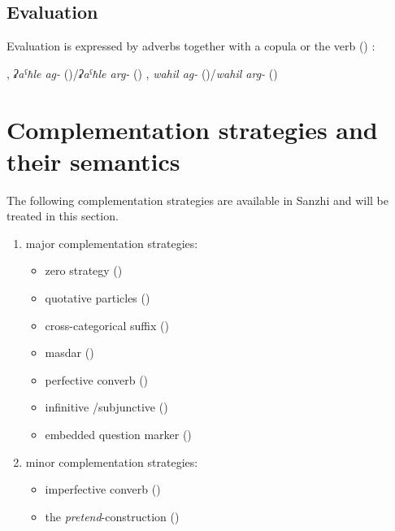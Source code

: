 
\subsection{Evaluation}
\label{ssec:Evaluation}

Evaluation is expressed by adverbs together with a copula or the verb  () :
%
\begin{exe}
	\ex	\label{ex:evaluation verbs}
	\begin{xlist}
		\ex	{}, \textit{ʡaˁħle ag-} ()\slash\textit{ʡaˁħle arg-} () 
		\ex	{}, \textit{wahil ag-} ()\slash\textit{wahil arg-} () 
	\end{xlist}
\end{exe}



\section{Complementation strategies and their semantics}
\label{sec:Complementation strategies and their semantics}

The following complementation strategies are available in Sanzhi and will be treated in this section.
%
\begin{enumerate}
	\item	major complementation strategies:
	\begin{itemize}
		\item	zero strategy ()
		\item	quotative particles  ()
		\item	cross-categorical suffix  ()
		\item	masdar  ()
		\item	perfective converb  ()
		\item	infinitive \slash subjunctive ()
		\item	embedded question marker  ()
	\end{itemize}

	\item	minor complementation strategies:
	\begin{itemize}
		\item	imperfective converb  ()
		\item the \textit{pretend}-construction ()
	\end{itemize}
\end{enumerate}

